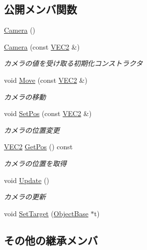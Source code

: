 \subsection*{公開メンバ関数}
\begin{DoxyCompactItemize}
\item 
\mbox{\hyperlink{class_camera_a01f94c3543f56ede7af49dc778f19331}{Camera}} ()
\item 
\mbox{\hyperlink{class_camera_afe282ee51f1f39c041b0e7de9386cc6d}{Camera}} (const \mbox{\hyperlink{common_8h_afb0c5e21d4133ff4f200992c0b534e1b}{V\+E\+C2}} \&)
\begin{DoxyCompactList}\small\item\em カメラの値を受け取る初期化コンストラクタ \end{DoxyCompactList}\item 
void \mbox{\hyperlink{class_camera_a5c6b7ad424d835a3022393099886a90b}{Move}} (const \mbox{\hyperlink{common_8h_afb0c5e21d4133ff4f200992c0b534e1b}{V\+E\+C2}} \&)
\begin{DoxyCompactList}\small\item\em カメラの移動 \end{DoxyCompactList}\item 
void \mbox{\hyperlink{class_camera_af79aa3fedd030712e7fa122a2ea88b48}{Set\+Pos}} (const \mbox{\hyperlink{common_8h_afb0c5e21d4133ff4f200992c0b534e1b}{V\+E\+C2}} \&)
\begin{DoxyCompactList}\small\item\em カメラの位置変更 \end{DoxyCompactList}\item 
\mbox{\hyperlink{common_8h_afb0c5e21d4133ff4f200992c0b534e1b}{V\+E\+C2}} \mbox{\hyperlink{class_camera_ac3b4f1248489c0ac0faa521329de71cd}{Get\+Pos}} () const
\begin{DoxyCompactList}\small\item\em カメラの位置を取得 \end{DoxyCompactList}\item 
void \mbox{\hyperlink{class_camera_a4a596a3ea1fdc7d244ba4268031a360b}{Update}} ()
\begin{DoxyCompactList}\small\item\em カメラの更新 \end{DoxyCompactList}\item 
void \mbox{\hyperlink{class_camera_a7336f8f6c9145bee1ce6b1f16f0aaee4}{Set\+Target}} (\mbox{\hyperlink{class_object_base}{Object\+Base}} $\ast$t)
\end{DoxyCompactItemize}
\subsection*{その他の継承メンバ}



